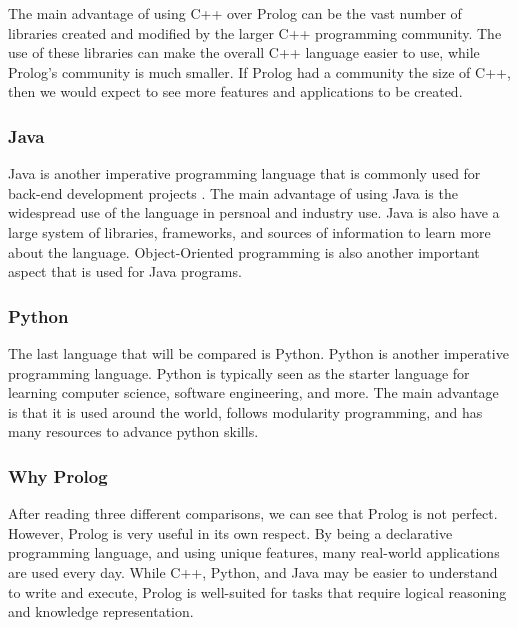 \documentclass{article}
\theoremstyle{theorem}
\theoremstyle{definition}
\theoremstyle{remark}
\begin{document}
\noindent\newline The main advantage of using C++ over Prolog can be the vast number of libraries created and modified by the larger C++ programming community. The use of these libraries can make the overall C++ language easier to use, while Prolog's community is much smaller. If Prolog had a community the size of C++, then we would expect to see more features and applications to be created. 


\subsubsection{Java}
\noindent\newline Java is another imperative programming language that is commonly used for back-end development projects \cite{(30)}. The main advantage of using Java is the widespread use of the language in persnoal and industry use. Java is also have a large system of libraries, frameworks, and sources of information to learn more about the language. Object-Oriented programming is also another important aspect that is used for Java programs.

\subsubsection{Python}
The last language that will be compared is Python. Python is another imperative programming language. Python is typically seen as the starter language for learning computer science, software engineering, and more. The main advantage is that it is used around the world, follows modularity programming, and has many resources to advance python skills.

\subsubsection{Why Prolog}
\noindent\newline After reading three different comparisons, we can see that Prolog is not perfect. However, Prolog is very useful in its own respect. By being a declarative programming language, and using unique features, many real-world applications are used every day. While C++, Python, and Java may be easier to understand to write and execute, Prolog is well-suited for tasks that require logical reasoning and knowledge representation.
\end{document}
